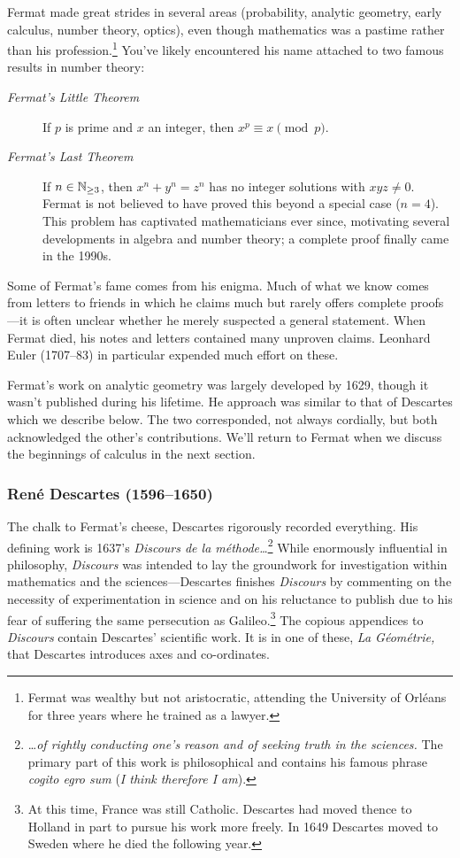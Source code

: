 Fermat made great strides in several areas (probability, analytic geometry, early calculus, number theory, optics), even though mathematics was a pastime rather than his profession.\footnote{%
	Fermat was wealthy but not aristocratic, attending the University of Orléans for three years where he trained as a lawyer.%
}
You've likely encountered his name attached to two famous results in number theory: 
	\begin{description}
		\item[\normalfont\emph{Fermat's Little Theorem}] If $p$ is prime and $x$ an integer, then $x^p\equiv x\pmod p$.
		\item[\normalfont\emph{Fermat's Last Theorem}] If $n\in\mathbb{N}_{\ge 3}$, then $x^n+y^n=z^n$ has no integer solutions with $xy z\neq 0$. Fermat is not believed to have proved this beyond a special case ($n=4$). This problem has captivated mathematicians ever since, motivating several developments in algebra and number theory; a complete proof finally came in the 1990s.
	\end{description}
Some of Fermat's fame comes from his enigma. Much of what we know comes from letters to friends in which he claims much but rarely offers complete proofs---it is often unclear whether he merely suspected a general statement. When Fermat died, his notes and letters contained many unproven claims. Leonhard Euler (1707--83) in particular expended much effort on these.
\smallbreak

Fermat's work on analytic geometry was largely developed by 1629, though it wasn't published during his lifetime. He approach was similar to that of Descartes which we describe below. The two corresponded, not always cordially, but both acknowledged the other's contributions. We'll return to Fermat when we discuss the beginnings of calculus in the next section.


\subsubsection*{René Descartes (1596--1650)} 

The chalk to Fermat's cheese, Descartes rigorously recorded everything. His defining work is 1637's \emph{Discours de la méthode\ldots}\footnote{%
	\ldots \emph{of rightly conducting one's reason and of seeking truth in the sciences.} The primary part of this work is philosophical and contains his famous phrase \emph{cogito egro sum} (\emph{I think therefore I am}).%
}
While enormously influential in philosophy, \emph{Discours} was intended to lay the groundwork for investigation within mathematics and the sciences---Descartes finishes \emph{Discours} by commenting on the necessity of experimentation in science and on his reluctance to publish due to his fear of suffering the same persecution as Galileo.\footnote{%
	At this time, France was still Catholic. Descartes had moved thence to Holland in part to pursue his work more freely. In 1649 Descartes moved to Sweden where he died the following year.%
} The copious appendices to \emph{Discours} contain Descartes' scientific work. It is in one of these, \emph{La Géométrie,} that Descartes introduces axes and co-ordinates.
\par


